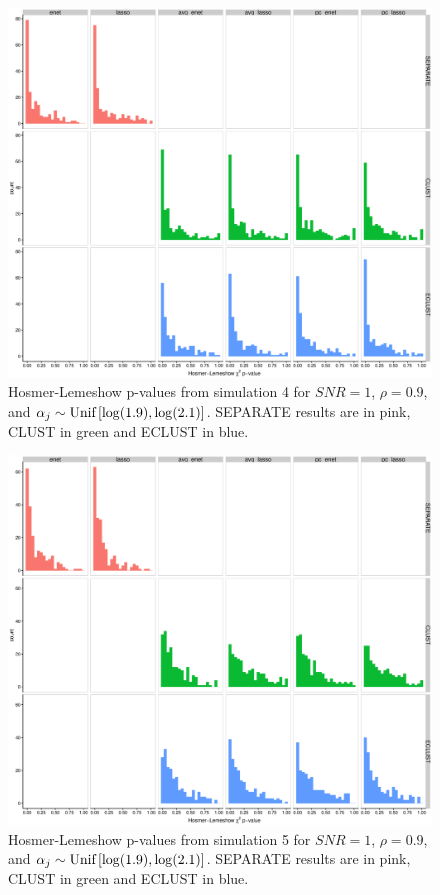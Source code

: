 \begin{appendices}
\begin{figure}[H]
	\centering
	\includegraphics[width=1\linewidth]{./figs/guillimin/results/figures/sim4-5-6-combined/calibration-pvalue_sim4.eps}
	\caption{Hosmer-Lemeshow p-values from simulation 4 for $SNR=1$, $\rho = 0.9$, and \mbox{$\alpha_{j} \sim \textrm{{Unif}}\left[\log(1.9), \log(2.1)\right]$}. SEPARATE results are in pink, CLUST in green and ECLUST in blue.}
	\label{fig:sim-calibrationhist4}
\end{figure}


\begin{figure}[H]
	\centering\includegraphics[width=1\linewidth]{./figs/guillimin/results/figures/sim4-5-6-combined/calibration-pvalue_sim5.eps}
	\caption{Hosmer-Lemeshow p-values from simulation 5 for $SNR=1$, $\rho = 0.9$, and \mbox{$\alpha_{j} \sim \textrm{{Unif}}\left[\log(1.9), \log(2.1)\right]$}. SEPARATE results are in pink, CLUST in green and ECLUST in blue.}\label{fig:sim-calibrationhist5}
\end{figure}


\end{appendices}
